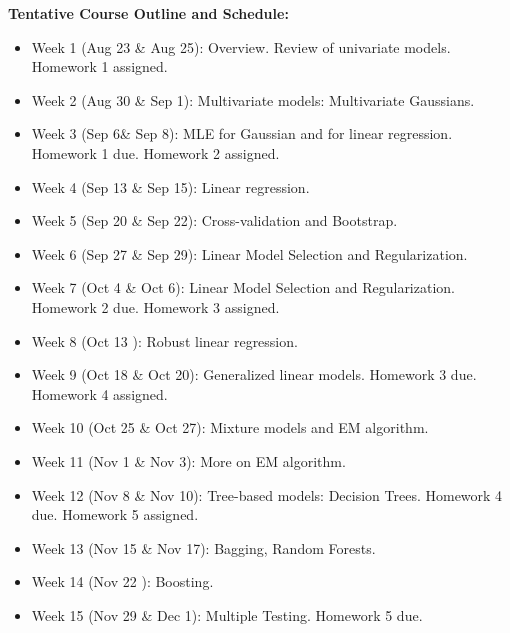 \documentclass[a4paper,10pt]{article}
\begin{document}
\textbf{Tentative Course Outline and Schedule:}

\begin{itemize}

\item Week 1 (Aug 23 \& Aug 25):  Overview.  Review of univariate models. Homework 1 assigned. 

\item Week 2 (Aug 30 \& Sep 1): Multivariate models: Multivariate Gaussians.

\item Week 3 (Sep 6\& Sep 8):   MLE for Gaussian and for linear regression. Homework 1 due. Homework 2 assigned.

\item Week 4 (Sep 13 \& Sep 15):  Linear regression.

\item Week 5 (Sep 20 \& Sep 22): Cross-validation and Bootstrap.

\item Week 6 (Sep 27 \& Sep 29): Linear Model Selection and Regularization.

\item Week 7 (Oct 4 \& Oct 6): Linear Model Selection and Regularization. Homework 2 due. Homework 3 assigned.

\item Week 8 (Oct 13 ):  Robust linear regression.

\item Week 9 (Oct 18 \& Oct 20):  Generalized linear models. Homework 3 due. Homework 4 assigned.

\item Week 10 (Oct 25 \& Oct 27):   Mixture models and EM algorithm.

\item Week 11 (Nov 1 \& Nov 3):   More on EM algorithm.

\item Week 12 (Nov 8 \& Nov 10): Tree-based models: Decision Trees.   Homework 4 due. Homework 5 assigned. 

\item Week 13 (Nov 15 \& Nov 17):  Bagging, Random Forests.

\item Week 14 (Nov 22 ): Boosting. 

\item Week 15 (Nov 29 \& Dec 1): Multiple Testing.  Homework 5 due. 
 
\end{itemize}
\end{document}
